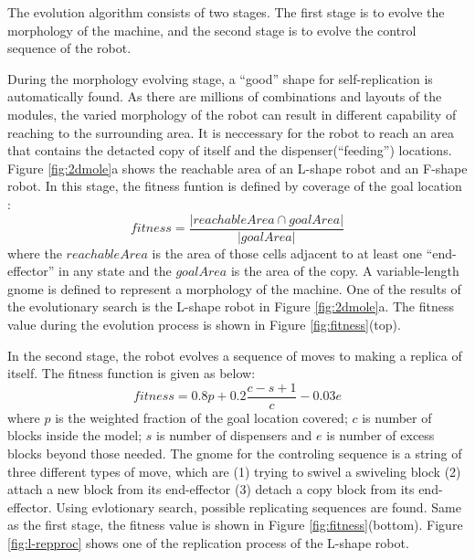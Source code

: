 \documentclass[12pt,twoside]{article}
\theoremstyle{plain}
\theoremstyle{definition}
\theoremstyle{remark}
\begin{document}
The evolution algorithm consists of two stages. The first stage is to evolve the morphology of the machine, and the second stage is to evolve the control sequence of the robot.

During the morphology evolving stage, a ``good'' shape for self-replication is automatically found. As there are millions of combinations and layouts of the modules, the varied morphology of the robot can result in different capability of reaching to the surrounding area. It is neccessary for the robot to reach an area that contains the detacted copy of itself and the dispenser(``feeding'') locations. Figure \ref{fig:2dmole}a shows the reachable area of an L-shape robot and an F-shape robot. In this stage, the fitness funtion is defined by coverage of the goal location :
\[ fitness = \frac{|reachableArea \cap goalArea|}{|goalArea|} \] where the $reachableArea$ is the area of those cells adjacent to at least one ``end-effector'' in any state and the $goalArea$ is the area of the copy. A variable-length gnome is defined to represent a morphology of the machine. One of the results of the evolutionary search is the L-shape robot in Figure \ref{fig:2dmole}a. The fitness value during the evolution process is shown in Figure \ref{fig:fitness}(top).

In the second stage, the robot evolves a sequence of moves to making a replica of itself. The fitness function is given as below: 
\[ fitness = 0.8p + 0.2 \frac{c - s + 1}{c} - 0.03 e \] 
where $p$ is the weighted fraction of the goal location covered; $c$ is number of blocks inside the model; $s$ is number of dispensers and $e$ is number of excess blocks beyond those needed. The gnome for the controling sequence is a string of three different types of move, which are (1) trying to swivel a swiveling block (2) attach a new block from its end-effector (3) detach a copy block from its end-effector. Using evlotionary search, possible replicating sequences are found. Same as the first stage, the fitness value is shown in  Figure \ref{fig:fitness}(bottom). Figure \ref{fig:l-repproc} shows one of the replication process of the L-shape robot.
 
\end{document}
